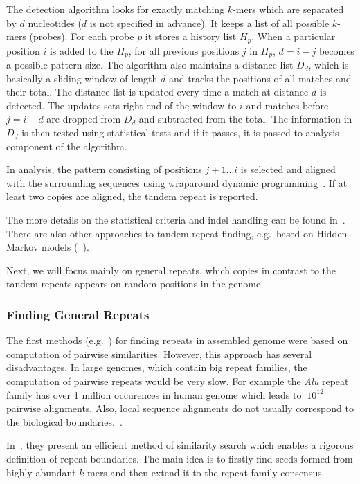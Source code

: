 The detection algorithm looks for exactly matching $k$-mers which are separated by $d$ nucleotides ($d$ is not specified in advance). It keeps a list of all possible $k$-mers (probes).
For each probe $p$ it stores a history list $H_p$.
When a particular position $i$ is added to the $H_p$, for all previous positions $j$ in $H_p$, $d = i - j$ becomes a possible pattern size.
The algorithm also maintains a distance list $D_d$, which is basically a sliding window of length $d$ and tracks the positions of all matches and their total. The distance list is updated every time a match at distance $d$ is detected. The updates sets right end of the window to $i$ and matches before $j = i - d$ are dropped from $D_d$ and subtracted from the total. The information in $D_d$ is then tested using statistical tests and if it passes, it is passed to analysis component of the algorithm.

In analysis, the pattern consisting of positions $j+1\dots i$ is selected and aligned with the surrounding sequences using wraparound dynamic programming~\cite{fischetti1992apostolico, myers1989approximate}. If at least two copies are aligned, the tandem repeat is reported.

The more details on the statistical criteria and indel handling can be found in~\cite{trf}. There are also other approaches to tandem repeat finding, e.g.\ based on Hidden Markov models (~\cite{tantan, nanasi2014probabilistic}).

Next, we will focus mainly on general repeats, which copies in contrast to the tandem repeats appears on random positions in the genome.

\subsubsection{Finding General Repeats}

The first methods (e.g.~\cite{reputer, repeatfinder, recon, repeatgluer, piler}) for finding repeats in assembled genome were based on computation of pairwise similarities. However, this approach has several disadvantages. In large genomes, which contain big repeat families, the computation of pairwise repeats would be very slow. For example the \textit{Alu} repeat family has over 1 million occurences in human genome which leads to $~10^{12}$ pairwise alignments.
Also, local sequence alignments do not usually correspond to the biological boundaries.~\cite{recon}.

In~\cite{repscout}, they present an efficient method of similarity search which enables a rigorous definition of repeat boundaries. The main idea is to firstly find seeds formed from highly abundant $k$-mers and then extend it to the repeat family consensus.

